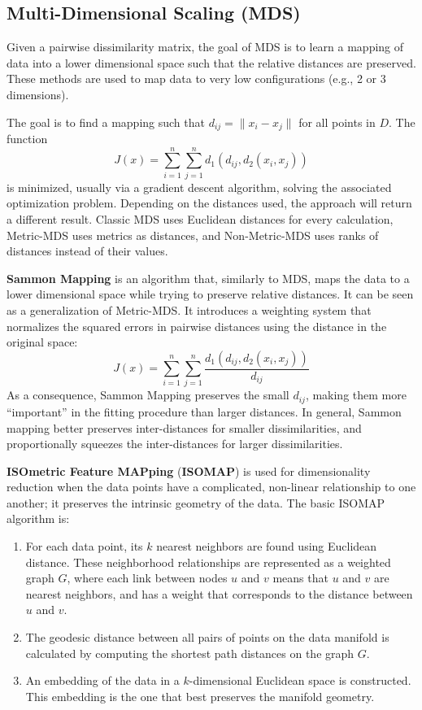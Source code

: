 \subsection{Multi-Dimensional Scaling (MDS)}

Given a pairwise dissimilarity matrix, the goal of MDS is to learn a mapping of data into a lower dimensional space such that the relative distances are preserved. These methods are used to map data to very low configurations (e.g., 2 or 3 dimensions).

The goal is to find a mapping such that $d_{ij} = \|x_i - x_j\|$ for all points in $D$. The function
    \begin{equation*}
        J(x) = \sum_{i=1}^n \sum_{j=1}^n d_1 (d_{ij}, d_2(x_i, x_j))
    \end{equation*}
is minimized, usually via a gradient descent algorithm, solving the associated optimization problem. Depending on the distances used, the approach will return a different result. Classic MDS uses Euclidean distances for every calculation, Metric-MDS uses metrics as distances, and Non-Metric-MDS uses ranks of distances instead of their values.

\textbf{Sammon Mapping} is an algorithm that, similarly to MDS, maps the data to a lower dimensional space while trying to preserve relative distances. It can be seen as a generalization of Metric-MDS. It introduces a weighting system that normalizes the squared errors in pairwise distances using the distance in the original space:
\begin{equation*}
    J(x) = \sum_{i=1}^n \sum_{j=1}^n \dfrac{d_1 (d_{ij}, d_2(x_i, x_j))}{d_{ij}}
\end{equation*}
As a consequence, Sammon Mapping preserves the small $d_{ij}$, making them more ``important'' in the fitting procedure than larger distances. In general, Sammon mapping better preserves inter-distances for smaller dissimilarities, and proportionally squeezes the inter-distances for larger dissimilarities.

\textbf{ISOmetric Feature MAPping} (\textbf{ISOMAP}) is used for dimensionality reduction when the data points have a complicated, non-linear relationship to one another; it preserves the intrinsic geometry of the data. The basic ISOMAP algorithm is:
\begin{enumerate}
    \item For each data point, its $k$ nearest neighbors are found using Euclidean distance. These neighborhood relationships are represented as a weighted graph $G$, where each link between nodes $u$ and $v$ means that $u$ and $v$ are nearest neighbors, and has a weight that corresponds to the distance between $u$ and $v$.

    \item The geodesic distance between all pairs of points on the data manifold is calculated by computing the shortest path distances on the graph $G$.

    \item An embedding of the data in a $k$-dimensional Euclidean space is constructed. This embedding is the one that best preserves the manifold geometry.
\end{enumerate}

